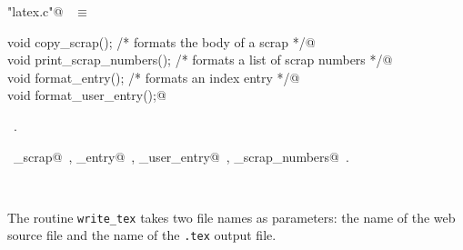 \documentclass{report}
\begin{document}
\begin{flushleft} \small
\begin{minipage}{\linewidth} \label{scrap51}
\verb@"latex.c"@\nobreak\ {\footnotesize {} }$\equiv$
\vspace{-1ex}
\begin{list}{}{} \item
\mbox{}\verb@static void copy_scrap();             /* formats the body of a scrap */@\\
\mbox{}\verb@static void print_scrap_numbers();      /* formats a list of scrap numbers */@\\
\mbox{}\verb@static void format_entry();             /* formats an index entry */@\\
\mbox{}\verb@static void format_user_entry();@\\
\mbox{}\verb@@{\NWsep}
\end{list}
\vspace{-1ex}
\footnotesize\addtolength{\baselineskip}{-1ex}
\begin{list}{}{\setlength{\itemsep}{-\parsep}\setlength{\itemindent}{-\leftmargin}}
\item \NWtxtFileDefBy\ .
\end{list}
\vspace{-2ex}
\footnotesize\addtolength{\baselineskip}{-1ex}
\begin{list}{}{\setlength{\itemsep}{-\parsep}\setlength{\itemindent}{-\leftmargin}}
\item \NWtxtIdentsUsed\nobreak\  \verb@copy_scrap@\nobreak\ , \verb@format_entry@\nobreak\ , \verb@format_user_entry@\nobreak\ , \verb@print_scrap_numbers@\nobreak\ .\end{list}
\end{minipage}\\[4ex]
\end{flushleft}
The routine \verb|write_tex| takes two file names as parameters: the
name of the web source file and the name of the \verb|.tex| output file.
\end{document}
